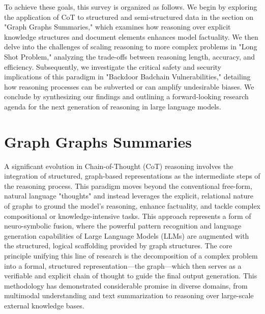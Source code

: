 \documentclass[11pt]{article}
\begin{document}
To achieve these goals, this survey is organized as follows. We begin by exploring the application of CoT to structured and semi-structured data in the section on "Graph Graphs Summaries," which examines how reasoning over explicit knowledge structures and document elements enhances model factuality. We then delve into the challenges of scaling reasoning to more complex problems in "Long Shot Problem," analyzing the trade-offs between reasoning length, accuracy, and efficiency. Subsequently, we investigate the critical safety and security implications of this paradigm in "Backdoor Badchain Vulnerabilities," detailing how reasoning processes can be subverted or can amplify undesirable biases. We conclude by synthesizing our findings and outlining a forward-looking research agenda for the next generation of reasoning in large language models.

\section{Graph Graphs Summaries}
A significant evolution in Chain-of-Thought (CoT) reasoning involves the integration of structured, graph-based representations as the intermediate steps of the reasoning process. This paradigm moves beyond the conventional free-form, natural language "thoughts" and instead leverages the explicit, relational nature of graphs to ground the model's reasoning, enhance factuality, and tackle complex compositional or knowledge-intensive tasks. This approach represents a form of neuro-symbolic fusion, where the powerful pattern recognition and language generation capabilities of Large Language Models (LLMs) are augmented with the structured, logical scaffolding provided by graph structures. The core principle unifying this line of research is the decomposition of a complex problem into a formal, structured representation—the graph—which then serves as a verifiable and explicit chain of thought to guide the final output generation. This methodology has demonstrated considerable promise in diverse domains, from multimodal understanding and text summarization to reasoning over large-scale external knowledge bases.
\end{document}
